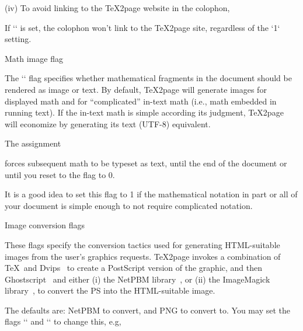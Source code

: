 (iv) To avoid linking to the \TeX2page website in the colophon,

\begintt
\let\TZPcolophondisableweblink=1
\endtt
%
If `\TZPcolophondisablecredit` is set, the colophon won’t link to the \TeX2page
site, regardless of the `\TZPcolophondisableweblink` setting.

\beginsection Math image flag

The `\TZPmathtext` flag
specifies whether mathematical fragments in the
document should be rendered as image or text.  By default, \TeX2page will
generate images for displayed math and for “complicated”
in-text math (i.e., math embedded in running text).   If the
in-text math is simple according its judgment, \TeX2page will
economize by generating its text (UTF-8) equivalent.

The assignment

\begintt
\let\TZPmathtext=1
\endtt
%
forces subsequent math to be typeset as text, until the end of the document or
until you reset to the flag to 0.

It is a good idea to set this flag to 1 if the
mathematical notation in part or all of your document is simple enough to
not require complicated notation.

\beginsection Image conversion flags

%
These flags specify the conversion tactics used
for generating HTML-suitable images from the user’s graphics
requests.  \TeX2page invokes a combination of \TeX\ and
Dvips~\cite{dvips} to create a PostScript version of the
graphic, and then Ghostscript~\cite{gs} and either (i) the
NetPBM library~\cite{netpbm}, or (ii) the ImageMagick
library~\cite{imagemagick}, to convert the PS into the
HTML-suitable image.

The defaults are: NetPBM
to convert, and PNG to convert to.
You may set the flags `\TZPimageconverter` and `\TZPimageformat` to
change this, e.g,

\begintt
\def\TZPimageconverter{imagemagick}  %
\def\TZPimageconverter{netpbm}       %

\def\TZPimageformat{gif}  %
\def\TZPimageformat{jpeg} %
\def\TZPimageformat{png}  %
\endtt

